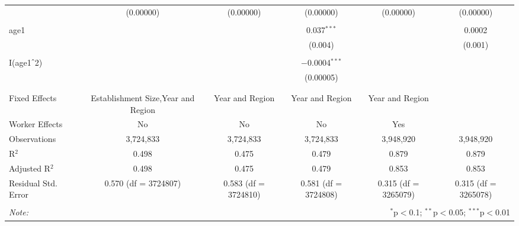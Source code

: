 \begin{table}[!htbp]
\begin{tabular}{@{\extracolsep{5pt}}lccccc}
  & (0.00000) & (0.00000) & (0.00000) & (0.00000) & (0.00000) \\ 
  & & & & & \\ 
 age1 &  &  & 0.037$^{***}$ &  & 0.0002 \\ 
  &  &  & (0.004) &  & (0.001) \\ 
  & & & & & \\ 
 I(age1$\hat{\mkern6mu}$2) &  &  & $-$0.0004$^{***}$ &  &  \\ 
  &  &  & (0.00005) &  &  \\ 
  & & & & & \\ 
\hline \\[-1.8ex] 
Fixed Effects & Establishment Size,Year and Region & Year and Region & Year and Region & Year and Region &  \\ 
Worker Effects & No & No & No & Yes &  \\ 
Observations & 3,724,833 & 3,724,833 & 3,724,833 & 3,948,920 & 3,948,920 \\ 
R$^{2}$ & 0.498 & 0.475 & 0.479 & 0.879 & 0.879 \\ 
Adjusted R$^{2}$ & 0.498 & 0.475 & 0.479 & 0.853 & 0.853 \\ 
Residual Std. Error & 0.570 (df = 3724807) & 0.583 (df = 3724810) & 0.581 (df = 3724808) & 0.315 (df = 3265079) & 0.315 (df = 3265078) \\ 
\hline 
\hline \\[-1.8ex] 
\textit{Note:}  & \multicolumn{5}{r}{$^{*}$p$<$0.1; $^{**}$p$<$0.05; $^{***}$p$<$0.01} \\ 
\end{tabular} 
\end{table} 
